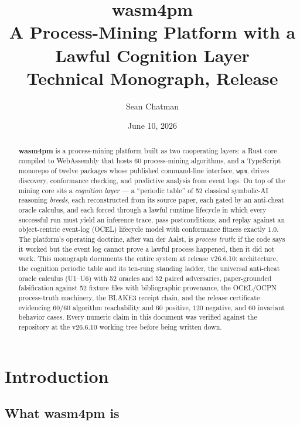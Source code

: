 \documentclass[11pt,oneside]{report}
\title{
  {\Huge \textbf{wasm4pm}}\\[0.6em]
  {\LARGE A Process-Mining Platform with a Lawful Cognition Layer}\\[0.8em]
  {\large Technical Monograph, Release \projver}
}
\author{Sean Chatman}
\date{June 10, 2026}
\newcommand{\wpm}{\texttt{wpm}}
\newcommand{\projver}{v26.6.10}
\begin{document}
\maketitle

\begin{abstract}
\noindent
\textbf{wasm4pm} is a process-mining platform built as two cooperating layers:
a Rust core compiled to WebAssembly that hosts 60 process-mining algorithms,
and a TypeScript monorepo of twelve packages whose published command-line
interface, \wpm{}, drives discovery, conformance checking, and predictive
analysis from event logs. On top of the mining core sits a \emph{cognition
layer} --- a ``periodic table'' of 52 classical symbolic-AI reasoning
\emph{breeds}, each reconstructed from its source paper, each gated by an
anti-cheat oracle calculus, and each forced through a lawful runtime
lifecycle in which every successful run must yield an inference trace, pass
postconditions, and replay against an object-centric event-log (OCEL)
lifecycle model with conformance fitness exactly $1.0$. The platform's
operating doctrine, after van der Aalst, is \emph{process truth}: if the code
says it worked but the event log cannot prove a lawful process happened, then
it did not work. This monograph documents the entire system at release
\projver{}: architecture, the cognition periodic table and its ten-rung
standing ladder, the universal anti-cheat oracle calculus (U1--U6) with 52
oracles and 52 paired adversaries, paper-grounded falsification against 52
fixture files with bibliographic provenance, the OCEL/OCPN process-truth
machinery, the BLAKE3 receipt chain, and the release certificate evidencing
$60/60$ algorithm reachability and $60$ positive, $120$ negative, and $60$
invariant behavior cases. Every numeric claim in this document was verified
against the repository at the \projver{} working tree before being written
down.
\end{abstract}

\tableofcontents

\chapter{Introduction}
\label{ch:intro}

\section{What wasm4pm is}
\end{document}
